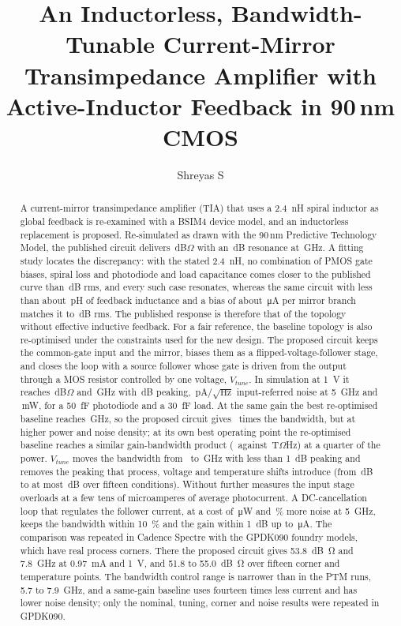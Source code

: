 \documentclass[11pt,a4paper]{article}
\title{An Inductorless, Bandwidth-Tunable Current-Mirror Transimpedance Amplifier with Active-Inductor Feedback in 90\,nm CMOS}
\author{Shreyas S}
\affil{Department of Electronics and Communication Engineering, R V College of Engineering, Bengaluru, India}
\date{}
\begin{document}
\maketitle

\begin{abstract}
A current-mirror transimpedance amplifier (TIA) that uses a \SI{2.4}{nH} spiral inductor as global feedback is re-examined with a BSIM4 device model, and an inductorless replacement is proposed. Re-simulated as drawn with the 90\,nm Predictive Technology Model, the published circuit delivers \BZt\,dB$\Omega$ with an \BPk\,dB resonance at \BFpk\,GHz. A fitting study locates the discrepancy: with the stated \SI{2.4}{nH}, no combination of PMOS gate biases, spiral loss and photodiode and load capacitance comes closer to the published curve than \DgRmsBestL\,dB rms, and every such case resonates, whereas the same circuit with less than about \DgLfMax\,pH of feedback inductance and a bias of about \DgIdNoL\,\si{\micro A} per mirror branch matches it to \DgRmsNoL\,dB rms. The published response is therefore that of the topology without effective inductive feedback. For a fair reference, the baseline topology is also re-optimised under the constraints used for the new design. The proposed circuit keeps the common-gate input and the mirror, biases them as a flipped-voltage-follower stage, and closes the loop with a source follower whose gate is driven from the output through a MOS resistor controlled by one voltage, $V_{tune}$. In simulation at \SI{1}{V} it reaches \PZt\,dB$\Omega$ and \PBW\,GHz with \PPk\,dB peaking, \PInFive\,pA/$\sqrt{\text{Hz}}$ input-referred noise at \SI{5}{GHz} and \PPow\,mW, for a \SI{50}{fF} photodiode and a \SI{30}{fF} load. At the same gain the best re-optimised baseline reaches \RgBw\,GHz, so the proposed circuit gives \BwRatioGain\ times the bandwidth, but at higher power and noise density; at its own best operating point the re-optimised baseline reaches a similar gain-bandwidth product (\RbGbw\ against \PGbw\,T$\Omega$Hz) at a quarter of the power. $V_{tune}$ moves the bandwidth from \TuneMin\ to \TuneMax\,GHz with less than \SI{1}{dB} peaking and removes the peaking that process, voltage and temperature shifts introduce (from \PvtPkMax\,dB to at most \PvtPkTMax\,dB over fifteen conditions). Without further measures the input stage overloads at a few tens of microamperes of average photocurrent. A DC-cancellation loop that regulates the follower current, at a cost of \DcPowAdd\,\si{\micro W} and \DcNoisePct\,\% more noise at \SI{5}{GHz}, keeps the bandwidth within \SI{10}{\percent} and the gain within \SI{1}{dB} up to \DcLimit\,\si{\micro A}. The comparison was repeated in Cadence Spectre with the GPDK090 foundry models, which have real process corners. There the proposed circuit gives \SI{53.8}{dB\ohm} and \SI{7.8}{GHz} at \SI{0.97}{mA} and \SI{1}{V}, and \SI{51.8}{} to \SI{55.0}{dB\ohm} over fifteen corner and temperature points. The bandwidth control range is narrower than in the PTM runs, \SI{5.7}{} to \SI{7.9}{GHz}, and a same-gain baseline uses fourteen times less current and has lower noise density; only the nominal, tuning, corner and noise results were repeated in GPDK090.
\end{abstract}
\end{document}
